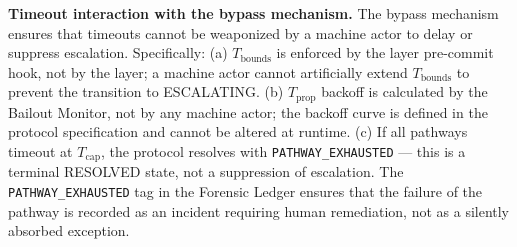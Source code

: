 \bigskip
\noindent\textbf{Timeout interaction with the bypass mechanism.} The bypass mechanism ensures that timeouts cannot be weaponized by a machine actor to delay or suppress escalation. Specifically: (a) $T_{\text{bounds}}$ is enforced by the \fact{} layer pre-commit hook, not by the \bounds{} layer; a machine actor cannot artificially extend $T_{\text{bounds}}$ to prevent the transition to ESCALATING. (b) $T_{\text{prop}}$ backoff is calculated by the Bailout Monitor, not by any machine actor; the backoff curve is defined in the protocol specification and cannot be altered at runtime. (c) If all pathways timeout at $T_{\text{cap}}$, the protocol resolves with \texttt{PATHWAY\_EXHAUSTED} --- this is a terminal RESOLVED state, not a suppression of escalation. The \texttt{PATHWAY\_EXHAUSTED} tag in the Forensic Ledger ensures that the failure of the pathway is recorded as an incident requiring human remediation, not as a silently absorbed exception.
